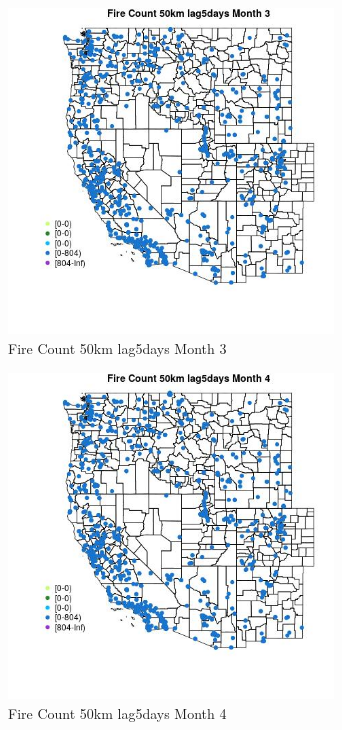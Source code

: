 \begin{figure} 
\centering  
\includegraphics[width=0.77\textwidth]{Code_Outputs/Report_ML_input_PM25_Step4_part_f_de_duplicated_aves_prioritize_24hr_obswNAs_MapObsMo3Fire_Count_50km_lag5days.jpg} 
\caption{\label{fig:Report_ML_input_PM25_Step4_part_f_de_duplicated_aves_prioritize_24hr_obswNAsMapObsMo3Fire_Count_50km_lag5days}Fire Count 50km lag5days Month 3} 
\end{figure} 
 

\begin{figure} 
\centering  
\includegraphics[width=0.77\textwidth]{Code_Outputs/Report_ML_input_PM25_Step4_part_f_de_duplicated_aves_prioritize_24hr_obswNAs_MapObsMo4Fire_Count_50km_lag5days.jpg} 
\caption{\label{fig:Report_ML_input_PM25_Step4_part_f_de_duplicated_aves_prioritize_24hr_obswNAsMapObsMo4Fire_Count_50km_lag5days}Fire Count 50km lag5days Month 4} 
\end{figure} 
 

